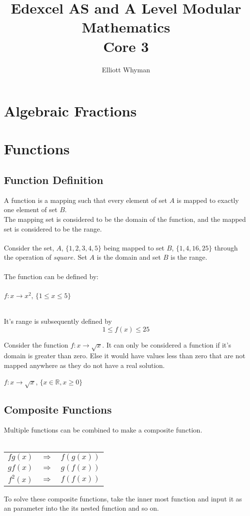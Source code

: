 \documentclass{article}
\begin{document}
	\title{Edexcel AS and A Level Modular Mathematics\\ Core 3}
	\author{Elliott Whyman}
	\maketitle		
	\tableofcontents
	\section{Algebraic Fractions}
	\newpage
	\section{Functions}
	\subsection{Function Definition}
	A function is a mapping such that every element of set $A$ is mapped to exactly one element of set $B$.
	\\  
	The mapping set is considered to be the domain of the function, and the mapped set is considered to be the range.
	\\\\
	Consider the set, $A$, $\{1,2,3,4,5\}$ being mapped to set $B$, $\{1,4,16,25\}$ through the operation of $square$.
	Set $A$ is the domain and set $B$ is the range.
	\\\\
	The function can be defined by:
	\\\\
	 \hfill {$f:x \rightarrow x^2$, $\{1\leq x \leq5\}$} \hspace*{\fill}
	\\\\
	\begin{center}
		It's range is subsequently defined by $$1\leq f(x) \leq 25$$
	\end{center}
	Consider the function $f:x \rightarrow \sqrt{x}$. It can only be considered a function if it's domain is greater than zero. Else it would have values less than zero that are not mapped anywhere as they do not have a real solution.
	\begin{center}
		$f:x \rightarrow \sqrt{x}$, $\{x \in \mathbb{R} , x \geq 0\}$
	\end{center}
	\subsection{Composite Functions}
	Multiple functions can be combined to make a composite function.
	\\\\
	\begin{center}
		\begin{tabular}{ccc}
			$fg(x)$ & $\Rightarrow$ & $f(g(x))$ \\
			$gf(x)$ & $\Rightarrow$ & $g(f(x))$ \\
			$f^2(x)$ & $\Rightarrow$ & $f(f(x))$
		\end{tabular}
	\end{center}
	To solve these composite functions, take the inner most function and input it as an parameter into the its nested function and so on.
\end{document}

